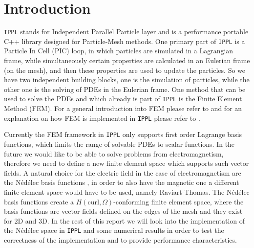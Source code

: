 \chapter{Introduction}



\texttt{IPPL} \cite{muralikrishnan2024scaling} stands for Independent Parallel Particle layer and is a performance portable C++ library designed for Particle-Mesh methods. One primary part of \texttt{IPPL} is a Particle In Cell (PIC) loop, in which particles are simulated in a Lagrangian frame, while simultaneously certain properties are calculated in an Eulerian frame (on the mesh), and then these properties are used to update the particles. So we have two independent building blocks, one is the simulation of particles, while the other one is the solving of PDEs in the Eulerian frame. One method that can be used to solve the PDEs and which already is part of \texttt{IPPL} is the Finite Element Method (FEM). For a general introduction into FEM please refer to \cite{femBook} and for an explanation on how FEM is implemented in \texttt{IPPL} please refer to \cite{femIppl}.\medskip

Currently the FEM framework in \texttt{IPPL} only supports first order Lagrange basis functions, which limits the range of solvable PDEs to scalar functions. In the future we would like to be able to solve problems from electromagnetism, therefore we need to define a new finite element space which supports such vector fields. A natural choice for the electric field in the case of electromagnetism are the Nédélec basis functions \cite{nedelec}, in order to also have the magnetic one a different finite element space would have to be used, namely Raviart-Thomas. The Nédélec basis functions create a \(H(\text{curl}, \Omega)\)-conforming finite element space, where the basis functions are vector fields defined on the edges of the mesh and they exist for 2D and 3D. In the rest of this report we will look into the implementation of the Nédélec space in \texttt{IPPL} and some numerical results in order to test the correctness of the implementation and to provide performance characteristics. 